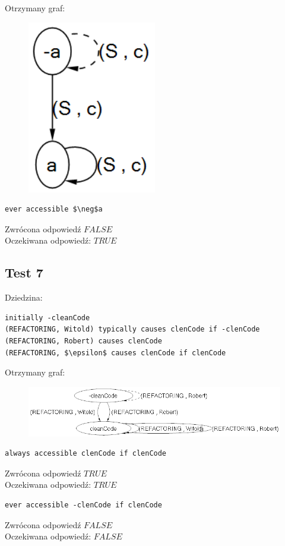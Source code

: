 \documentclass{article}
\begin{document}
Otrzymany graf:
\begin{figure}[H]
	\centering
	\includegraphics[scale=0.6]{test7_graf}
\end{figure}

\begin{lstlisting}[mathescape=true]
ever accessible $\neg$a
\end{lstlisting}
Zwrócona odpowiedź $FALSE$\\
Oczekiwana odpowiedź: $TRUE$
\newpage
\subsection{Test 7}
Dziedzina:
\bigskip
{}
\begin{lstlisting}[mathescape=true]
initially -cleanCode
(REFACTORING, Witold) typically causes clenCode if -clenCode
(REFACTORING, Robert) causes clenCode
(REFACTORING, $\epsilon$ causes clenCode if clenCode
\end{lstlisting}
\vspace{1cm}

Otrzymany graf:
\begin{figure}[H]
	\centering
	\includegraphics[scale=0.6]{test8_graf}
\end{figure}

\begin{lstlisting}[mathescape=true]
always accessible clenCode if clenCode
\end{lstlisting}
Zwrócona odpowiedź $TRUE$\\
Oczekiwana odpowiedź: $TRUE$
\begin{lstlisting}[mathescape=true]
ever accessible -clenCode if clenCode
\end{lstlisting}
Zwrócona odpowiedź $FALSE$\\
Oczekiwana odpowiedź: $FALSE$


\newpage
\end{document}
